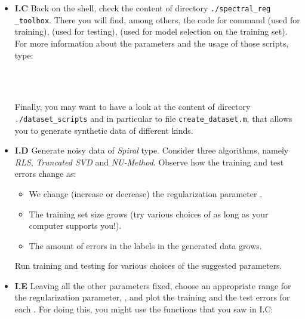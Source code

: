 \documentclass[DIN, pagenumber=false, fontsize=11pt, parskip=half]{scrartcl}
\begin{document}
\begin{itemize}
	\item \textbf{I.C} Back on the shell, check the content of directory \texttt{./spectral\_reg} \texttt{\_toolbox}. 
	There you will find, among others, the code for command  (used for training),  (used for testing),  (used for model selection on the training set).
For more information about the parameters and the usage of those scripts, type:

\\
\\


Finally, you may want to have a look at the content of directory \texttt{./dataset\_scripts} and in particular to file \texttt{create\_dataset.m}, that  allows you to generate synthetic data of different kinds.

\item \textbf{I.D} Generate noisy data of \emph{Spiral} type. Consider three algorithms, namely \emph{RLS}, \emph{Truncated SVD} and \emph{NU-Method}. Observe how the training and test errors change as:
	
\begin{itemize}
  \item We change (increase or decrease) the regularization parameter .
  \item The training set size grows (try various choices of  as long as your computer supports you!).
  \item The amount of errors in the labels in the generated data grows.
\end{itemize}
Run training and testing for various choices of the suggested parameters.

\item \textbf{I.E} Leaving all the other parameters fixed, choose an appropriate range for the regularization parameter, , and plot the training and the test errors for each . 
For doing this, you might use the functions that you saw in I.C:

\\
\\

\\


\end{itemize}
\end{document}
